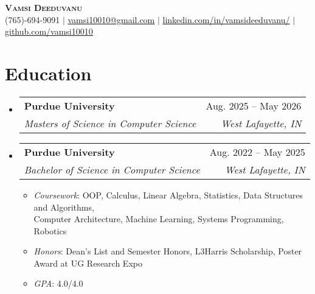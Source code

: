 \documentclass[letterpaper,11pt]{article}
\makeatletter
\newcommand{\resumeItem}[1]{
  \item\small{
    {#1 \vspace{-2pt}}
  }
}
\newcommand{\resumeSubheading}[4]{
  \vspace{-2pt}\item
    \begin{tabular*}{0.97\textwidth}[t]{l@{\extracolsep{\fill}}r}
      \textbf{\small#1} & \small#2 \\
      \textit{\small#3} & \textit{\small #4} \\
    \end{tabular*}\vspace{-7pt}
}
\newcommand{\resumeSubHeadingListStart}{\begin{itemize}[leftmargin=0.15in, label={}]}
\newcommand{\resumeSubHeadingListEnd}{\end{itemize}}
\newcommand{\resumeItemListStart}{\begin{itemize}}
\newcommand{\resumeItemListEnd}{\end{itemize}\vspace{-5pt}}
\makeatother
\begin{document}
\begin{center}
    \textbf{\Huge \scshape Vamsi Deeduvanu} \\ \vspace{1pt}
    \small (765)-694-9091 $|$ \href{mailto:vamsi10010@gmail.com}{\underline{vamsi10010@gmail.com}} $|$ 
    \href{https://www.linkedin.com/in/vamsideeduvanu}{\underline{linkedin.com/in/vamsideeduvanu/}} $|$
    \href{https://github.com/vamsi10010}{\underline{github.com/vamsi10010}}
\end{center}



\section{Education}
  \resumeSubHeadingListStart
    \resumeSubheading
      {Purdue University}{Aug. 2025 -- May 2026}
      {Masters of Science in Computer Science}{West Lafayette, IN}
    \resumeSubheading
      {Purdue University}{Aug. 2022 -- May 2025}
      {Bachelor of Science in Computer Science}{West Lafayette, IN}
      \resumeItemListStart
        \resumeItem{\textit{Coursework}: OOP, Calculus, Linear Algebra, Statistics, Data Structures and Algorithms, \\Computer Architecture,
        Machine Learning, Systems Programming, Robotics
        }
        \resumeItem{\textit{Honors}: Dean's List and Semester Honors, L3Harris Scholarship, Poster Award at UG Research Expo}
        \resumeItem{\textit{GPA}: 4.0/4.0}
      \resumeItemListEnd
  \resumeSubHeadingListEnd


\end{document}
